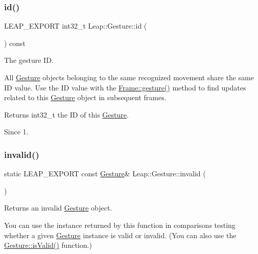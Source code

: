 \subsubsection{\texorpdfstring{id()}{id()}}
{\footnotesize\ttfamily L\+E\+A\+P\+\_\+\+E\+X\+P\+O\+RT int32\+\_\+t Leap\+::\+Gesture\+::id (\begin{DoxyParamCaption}{ }\end{DoxyParamCaption}) const}

The gesture ID.

All \hyperlink{class_leap_1_1_gesture}{Gesture} objects belonging to the same recognized movement share the same ID value. Use the ID value with the \hyperlink{class_leap_1_1_frame_a107df376205952e9ade4237592494a0e}{Frame\+::gesture()} method to find updates related to this \hyperlink{class_leap_1_1_gesture}{Gesture} object in subsequent frames.


\begin{DoxyCodeInclude}
\end{DoxyCodeInclude}


\begin{DoxyReturn}{Returns}
int32\+\_\+t the ID of this \hyperlink{class_leap_1_1_gesture}{Gesture}. 
\end{DoxyReturn}
\begin{DoxySince}{Since}
1. 
\end{DoxySince}
\mbox{\label{class_leap_1_1_gesture_a76cbf3abfeb8c1b4fb6faed4483bb185}} 
\subsubsection{\texorpdfstring{invalid()}{invalid()}}
{\footnotesize\ttfamily static L\+E\+A\+P\+\_\+\+E\+X\+P\+O\+RT const \hyperlink{class_leap_1_1_gesture}{Gesture}\& Leap\+::\+Gesture\+::invalid (\begin{DoxyParamCaption}{ }\end{DoxyParamCaption})\hspace{0.3cm}{\ttfamily [static]}}

Returns an invalid \hyperlink{class_leap_1_1_gesture}{Gesture} object.

You can use the instance returned by this function in comparisons testing whether a given \hyperlink{class_leap_1_1_gesture}{Gesture} instance is valid or invalid. (You can also use the \hyperlink{class_leap_1_1_gesture_a3130fbe24db5a9fe70793ee7d7094e58}{Gesture\+::is\+Valid()} function.)


